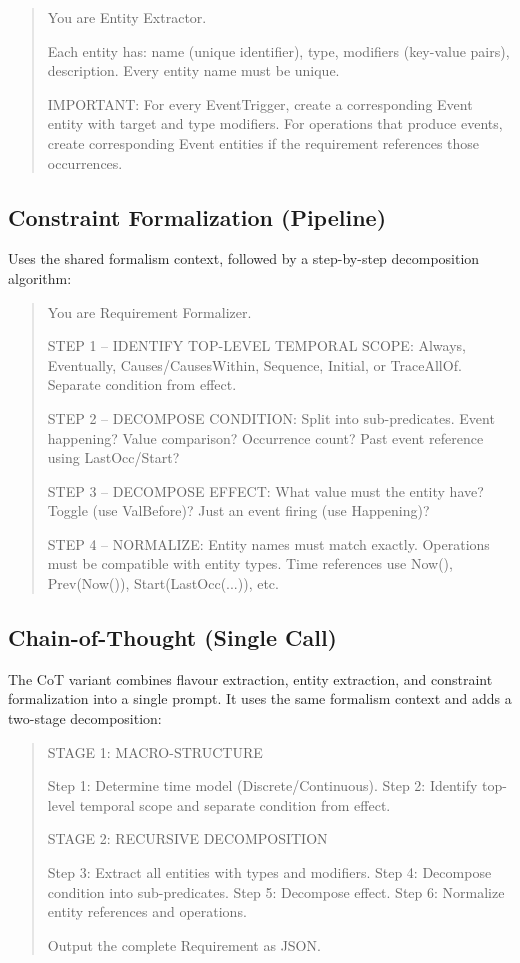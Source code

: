 {\footnotesize\ttfamily
\begin{quote}
You are Entity Extractor.


Each entity has: name (unique identifier), type,
modifiers (key-value pairs), description.
Every entity name must be unique.

IMPORTANT: For every EventTrigger, create a
corresponding Event entity with target and type
modifiers. For operations that produce events, create
corresponding Event entities if the requirement
references those occurrences.
\end{quote}
}

\subsection{Constraint Formalization (Pipeline)}
\label{app:prompt-formula}

Uses the shared formalism context, followed by a
step-by-step decomposition algorithm:

{\footnotesize\ttfamily
\begin{quote}
You are Requirement Formalizer.


STEP 1 -- IDENTIFY TOP-LEVEL TEMPORAL SCOPE:
Always, Eventually, Causes/CausesWithin, Sequence,
Initial, or TraceAllOf. Separate condition from
effect.

STEP 2 -- DECOMPOSE CONDITION:
Split into sub-predicates. Event happening?
Value comparison? Occurrence count? Past event
reference using LastOcc/Start?

STEP 3 -- DECOMPOSE EFFECT:
What value must the entity have? Toggle (use
ValBefore)? Just an event firing (use Happening)?

STEP 4 -- NORMALIZE:
Entity names must match exactly. Operations must be
compatible with entity types. Time references use
Now(), Prev(Now()), Start(LastOcc(...)), etc.
\end{quote}
}

\subsection{Chain-of-Thought (Single Call)}
\label{app:prompt-cot}

The CoT variant combines flavour extraction, entity extraction, and
constraint formalization into a single prompt. It uses the same
formalism context and adds a two-stage decomposition:

{\footnotesize\ttfamily
\begin{quote}
STAGE 1: MACRO-STRUCTURE

Step 1: Determine time model (Discrete/Continuous).
Step 2: Identify top-level temporal scope and
separate condition from effect.

STAGE 2: RECURSIVE DECOMPOSITION

Step 3: Extract all entities with types and modifiers.
Step 4: Decompose condition into sub-predicates.
Step 5: Decompose effect.
Step 6: Normalize entity references and operations.

Output the complete Requirement as JSON.
\end{quote}
}
